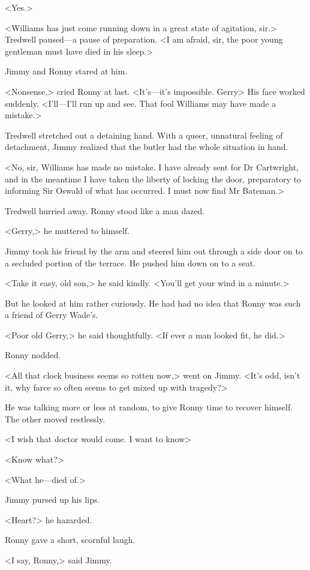 <Yes.>

<Williams has just come running down in a great state of agitation, sir.> Tredwell paused—a pause of preparation. <I am afraid, sir, the poor young gentleman must have died in his sleep.>

Jimmy and Ronny stared at him.

<Nonsense,> cried Ronny at last. <It's—it's impossible. Gerry\longdash> His face worked suddenly. <I'll—I'll run up and see. That fool Williams may have made a mistake.>

Tredwell stretched out a detaining hand. With a queer, unnatural feeling of detachment, Jimmy realized that the butler had the whole situation in hand.

<No, sir, Williams has made no mistake. I have already sent for Dr Cartwright, and in the meantime I have taken the liberty of locking the door, preparatory to informing Sir Oswald of what has occurred. I must now find Mr Bateman.>

Tredwell hurried away. Ronny stood like a man dazed.

<Gerry,> he muttered to himself.

Jimmy took his friend by the arm and steered him out through a side door on to a secluded portion of the terrace. He pushed him down on to a seat.

<Take it easy, old son,> he said kindly. <You'll get your wind in a minute.>

But he looked at him rather curiously. He had had no idea that Ronny was such a friend of Gerry Wade's.

<Poor old Gerry,> he said thoughtfully. <If ever a man looked fit, he did.>

Ronny nodded.

<All that clock business seems so rotten now,> went on Jimmy. <It's odd, isn't it, why farce so often seems to get mixed up with tragedy?>

He was talking more or less at random, to give Ronny time to recover himself. The other moved restlessly.

<I wish that doctor would come. I want to know\longdash>

<Know what?>

<What he—died of.>

Jimmy pursed up his lips.

<Heart?> he hazarded.

Ronny gave a short, scornful laugh.

<I say, Ronny,> said Jimmy.

